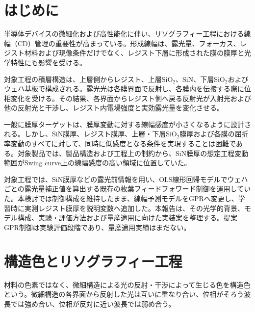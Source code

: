 \documentclass[11pt,a4paper]{ltjsarticle}
\begin{document}
\setcounter{page}{1}
\tableofcontents
\clearpage


\section{はじめに}
\label{sec:introduction}

半導体デバイスの微細化および高性能化に伴い、リソグラフィー工程における線幅（CD）管理の重要性が高まっている。形成線幅は、露光量、フォーカス、レジスト材料および現像条件だけでなく、レジスト下層に形成された膜の膜厚と光学特性にも影響を受ける\cite{mack2007}。

対象工程の積層構造は、上層側からレジスト、上層SiO$_2$、SiN、下層SiO$_2$およびウェハ基板で構成される。露光光は各膜界面で反射し、各膜内を伝搬する際に位相変化を受ける。その結果、各界面からレジスト側へ戻る反射光が入射光および他の反射光と干渉し、レジスト内電場強度と実効露光量を変化させる。

一般に膜厚ターゲットは、膜厚変動に対する線幅感度が小さくなるように設計される。しかし、SiN膜厚、レジスト膜厚、上層・下層SiO$_2$膜厚および各膜の屈折率変動のすべてに対して、同時に低感度となる条件を実現することは困難である。対象製品では、製品構造および工程上の制約から、SiN膜厚の想定工程変動範囲がSwing curve上の線幅感度の高い領域に位置していた。

対象工程では、SiN膜厚などの露光前情報を用い、OLS線形回帰モデルでウェハごとの露光量補正値を算出する既存の枚葉フィードフォワード制御を運用していた。本検討では制御構成を維持したまま、線幅予測モデルをGPRへ変更し、学習時に実測レジスト膜厚を説明変数へ追加した。本報告は、その光学的背景、モデル構成、実験・評価方法および量産適用に向けた実装案を整理する。提案GPR制御は実験評価段階であり、量産適用実績はまだない。


\section{構造色とリソグラフィー工程}
\label{sec:structural-color}

材料の色素ではなく、微細構造による光の反射・干渉によって生じる色を構造色という\cite{kinoshita2008}。微細構造の各界面から反射した光は互いに重なり合い、位相がそろう波長では強め合い、位相が反対に近い波長では弱め合う。
\end{document}
